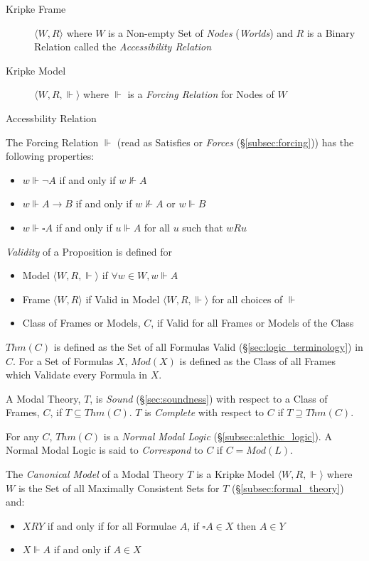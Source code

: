 \documentclass{article}
\begin{document}
\begin{description}
\item [Kripke Frame] $\langle W,R \rangle$ where $W$ is a Non-empty
  Set of \emph{Nodes} (\emph{Worlds}) and $R$ is a Binary Relation
  called the \emph{Accessibility Relation}
\item [Kripke Model] $\langle W,R,\Vdash \rangle$ where $\Vdash$ is a
  \emph{Forcing Relation} for Nodes of $W$
\end{description}
Accessbility Relation %

The Forcing Relation $\Vdash$ (read as Satisfies or \emph{Forces}
(\S\ref{subsec:forcing})) has the following properties:
\begin{itemize}
\item $w \Vdash \neg A$ if and only if $w \nVdash A$
\item $w \Vdash A \rightarrow B$ if and only if $w \nVdash A$ or $w
  \Vdash B$
\item $w \Vdash \square A$ if and only if $u \Vdash A$ for all $u$
  such that $w R u$
\end{itemize}
\emph{Validity} of a Proposition is defined for
\begin{itemize}
\item Model $\langle W,R, \Vdash \rangle$ if $\forall w \in W,
  w \Vdash A$
\item Frame $\langle W,R \rangle$ if Valid in Model $\langle W,R,
  \Vdash \rangle$ for all choices of $\Vdash$
\item Class of Frames or Models, $C$, if Valid for all Frames or
  Models of the Class
\end{itemize}
$Thm(C)$ is defined as the Set of all Formulas Valid
(\S\ref{sec:logic_terminology}) in $C$. For a Set of Formulas $X$,
$Mod(X)$ is defined as the Class of all Frames which Validate every
Formula in $X$.

A Modal Theory, $T$, is \emph{Sound} (\S\ref{sec:soundness}) with
respect to a Class of Frames, $C$, if $T \subseteq Thm(C)$. $T$ is
\emph{Complete} with respect to $C$ if $T \supseteq Thm(C)$.

For any $C$, $Thm(C)$ is a \emph{Normal Modal Logic}
(\S\ref{subsec:alethic_logic}). A Normal Modal Logic is said to
\emph{Correspond} to $C$ if $C = Mod(L)$.

The \emph{Canonical Model} of a Modal Theory $T$ is a Kripke Model
$\langle W,R, \Vdash \rangle$ where $W$ is the Set of all Maximally
Consistent Sets for $T$ (\S\ref{subsec:formal_theory}) and:
\begin{itemize}
\item $XRY$ if and only if for all Formulae $A$, if $\square A
  \in X$ then $A \in Y$
\item $X\Vdash A$ if and only if $A \in X$
\end{itemize}
\end{document}
